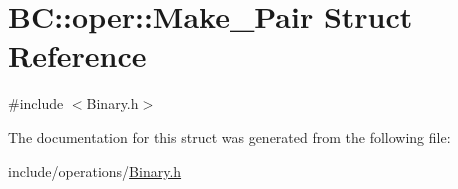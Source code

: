\hypertarget{structBC_1_1oper_1_1Make__Pair}{}\section{BC\+:\+:oper\+:\+:Make\+\_\+\+Pair Struct Reference}
\label{structBC_1_1oper_1_1Make__Pair}


{\ttfamily \#include $<$Binary.\+h$>$}



The documentation for this struct was generated from the following file\+:\begin{DoxyCompactItemize}
\item 
include/operations/\hyperlink{Binary_8h}{Binary.\+h}\end{DoxyCompactItemize}
